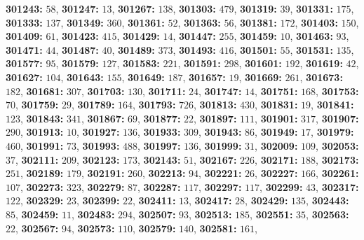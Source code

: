 \textsf{\bfseries 301243:} $58$, \textsf{\bfseries 301247:} $13$, \textsf{\bfseries 301267:} $138$, \textsf{\bfseries 301303:} $479$, \textsf{\bfseries 301319:} $39$, \textsf{\bfseries 301331:} $175$, \textsf{\bfseries 301333:} $137$, \textsf{\bfseries 301349:} $360$, \textsf{\bfseries 301361:} $52$, \textsf{\bfseries 301363:} $56$, \textsf{\bfseries 301381:} $172$, \textsf{\bfseries 301403:} $150$, \textsf{\bfseries 301409:} $61$, \textsf{\bfseries 301423:} $415$, \textsf{\bfseries 301429:} $14$, \textsf{\bfseries 301447:} $255$, \textsf{\bfseries 301459:} $10$, \textsf{\bfseries 301463:} $93$, \textsf{\bfseries 301471:} $44$, \textsf{\bfseries 301487:} $40$, \textsf{\bfseries 301489:} $373$, \textsf{\bfseries 301493:} $416$, \textsf{\bfseries 301501:} $55$, \textsf{\bfseries 301531:} $135$, \textsf{\bfseries 301577:} $95$, \textsf{\bfseries 301579:} $127$, \textsf{\bfseries 301583:} $221$, \textsf{\bfseries 301591:} $298$, \textsf{\bfseries 301601:} $192$, \textsf{\bfseries 301619:} $42$, \textsf{\bfseries 301627:} $104$, \textsf{\bfseries 301643:} $155$, \textsf{\bfseries 301649:} $187$, \textsf{\bfseries 301657:} $19$, \textsf{\bfseries 301669:} $261$, \textsf{\bfseries 301673:} $182$, \textsf{\bfseries 301681:} $307$, \textsf{\bfseries 301703:} $130$, \textsf{\bfseries 301711:} $24$, \textsf{\bfseries 301747:} $14$, \textsf{\bfseries 301751:} $168$, \textsf{\bfseries 301753:} $70$, \textsf{\bfseries 301759:} $29$, \textsf{\bfseries 301789:} $164$, \textsf{\bfseries 301793:} $726$, \textsf{\bfseries 301813:} $430$, \textsf{\bfseries 301831:} $19$, \textsf{\bfseries 301841:} $123$, \textsf{\bfseries 301843:} $341$, \textsf{\bfseries 301867:} $69$, \textsf{\bfseries 301877:} $22$, \textsf{\bfseries 301897:} $111$, \textsf{\bfseries 301901:} $317$, \textsf{\bfseries 301907:} $290$, \textsf{\bfseries 301913:} $10$, \textsf{\bfseries 301927:} $136$, \textsf{\bfseries 301933:} $309$, \textsf{\bfseries 301943:} $86$, \textsf{\bfseries 301949:} $17$, \textsf{\bfseries 301979:} $460$, \textsf{\bfseries 301991:} $73$, \textsf{\bfseries 301993:} $488$, \textsf{\bfseries 301997:} $136$, \textsf{\bfseries 301999:} $31$, \textsf{\bfseries 302009:} $109$, \textsf{\bfseries 302053:} $37$, \textsf{\bfseries 302111:} $209$, \textsf{\bfseries 302123:} $173$, \textsf{\bfseries 302143:} $51$, \textsf{\bfseries 302167:} $226$, \textsf{\bfseries 302171:} $188$, \textsf{\bfseries 302173:} $251$, \textsf{\bfseries 302189:} $179$, \textsf{\bfseries 302191:} $260$, \textsf{\bfseries 302213:} $94$, \textsf{\bfseries 302221:} $26$, \textsf{\bfseries 302227:} $166$, \textsf{\bfseries 302261:} $107$, \textsf{\bfseries 302273:} $323$, \textsf{\bfseries 302279:} $87$, \textsf{\bfseries 302287:} $117$, \textsf{\bfseries 302297:} $117$, \textsf{\bfseries 302299:} $43$, \textsf{\bfseries 302317:} $122$, \textsf{\bfseries 302329:} $23$, \textsf{\bfseries 302399:} $22$, \textsf{\bfseries 302411:} $13$, \textsf{\bfseries 302417:} $28$, \textsf{\bfseries 302429:} $135$, \textsf{\bfseries 302443:} $85$, \textsf{\bfseries 302459:} $11$, \textsf{\bfseries 302483:} $294$, \textsf{\bfseries 302507:} $93$, \textsf{\bfseries 302513:} $185$, \textsf{\bfseries 302551:} $35$, \textsf{\bfseries 302563:} $22$, \textsf{\bfseries 302567:} $94$, \textsf{\bfseries 302573:} $110$, \textsf{\bfseries 302579:} $140$, \textsf{\bfseries 302581:} $161$, 
